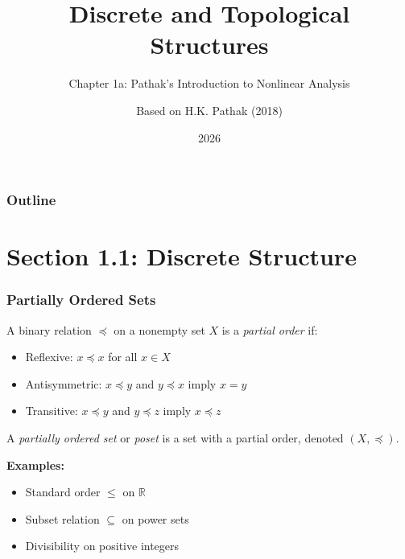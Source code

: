 \documentclass[aspectratio=169,10pt]{beamer}
\title{Discrete and Topological Structures}
\subtitle{Chapter 1a: Pathak's Introduction to Nonlinear Analysis}
\author{Based on H.K. Pathak (2018)}
\date{2026}
\begin{document}
\frame{\titlepage}

\begin{frame}
\frametitle{Outline}
\tableofcontents[hideallsubsections]
\end{frame}

\section{Section 1.1: Discrete Structure}

\begin{frame}
\frametitle{Partially Ordered Sets}

\begin{definition}
A binary relation $\preceq$ on a nonempty set $X$ is a \emph{partial order} if:
\begin{itemize}
\item[\textbf{P1}] Reflexive: $x \preceq x$ for all $x \in X$
\item[\textbf{P2}] Antisymmetric: $x \preceq y$ and $y \preceq x$ imply $x = y$
\item[\textbf{P3}] Transitive: $x \preceq y$ and $y \preceq z$ imply $x \preceq z$
\end{itemize}
\end{definition}

A \emph{partially ordered set} or \emph{poset} is a set with a partial order, denoted $(X, \preceq)$.

\vspace{0.3cm}

\textbf{Examples:}
\begin{itemize}
\item Standard order $\leq$ on $\mathbb{R}$
\item Subset relation $\subseteq$ on power sets
\item Divisibility on positive integers
\end{itemize}
\end{frame}
\end{document}
